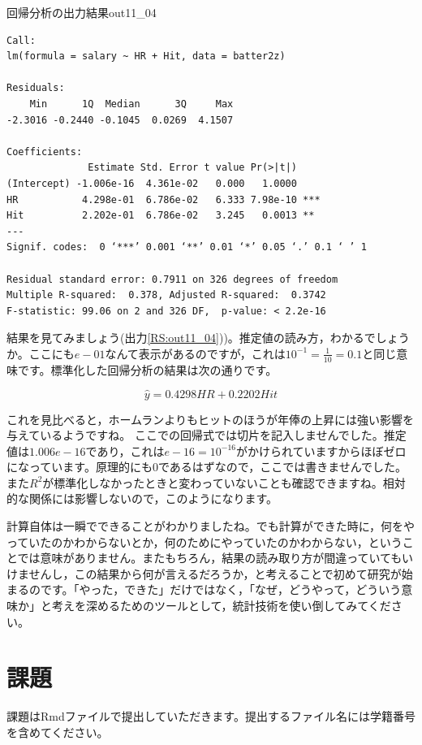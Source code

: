 \documentclass{ltjbook}
\begin{document}
\begin{Rscreen}{回帰分析の出力結果}{out11_04}
\begin{verbatim}
Call:
lm(formula = salary ~ HR + Hit, data = batter2z)

Residuals:
    Min      1Q  Median      3Q     Max 
-2.3016 -0.2440 -0.1045  0.0269  4.1507 

Coefficients:
              Estimate Std. Error t value Pr(>|t|)    
(Intercept) -1.006e-16  4.361e-02   0.000   1.0000    
HR           4.298e-01  6.786e-02   6.333 7.98e-10 ***
Hit          2.202e-01  6.786e-02   3.245   0.0013 ** 
---
Signif. codes:  0 ‘***’ 0.001 ‘**’ 0.01 ‘*’ 0.05 ‘.’ 0.1 ‘ ’ 1

Residual standard error: 0.7911 on 326 degrees of freedom
Multiple R-squared:  0.378,	Adjusted R-squared:  0.3742 
F-statistic: 99.06 on 2 and 326 DF,  p-value: < 2.2e-16
\end{verbatim}
\end{Rscreen}

結果を見てみましょう(出力\ref{RS:out11_04}))。推定値の読み方，わかるでしょうか。ここにも$e-01$なんて表示があるのですが，これは$10^{-1}=\frac{1}{10}=0.1$と同じ意味です。標準化した回帰分析の結果は次の通りです。

\[ \hat{y} = 0.4298 HR + 0.2202 Hit \]

これを見比べると，ホームランよりもヒットのほうが年俸の上昇には強い影響を与えているようですね。
ここでの回帰式では切片を記入しませんでした。推定値は$1.006e-16$であり，これは$e-16=10^{-16}$がかけられていますからほぼゼロになっています。原理的にも$0$であるはずなので，ここでは書きませんでした。
また$R^2$が標準化しなかったときと変わっていないことも確認できますね。相対的な関係には影響しないので，このようになります。

計算自体は一瞬でできることがわかりましたね。でも計算ができた時に，何をやっていたのかわからないとか，何のためにやっていたのかわからない，ということでは意味がありません。またもちろん，結果の読み取り方が間違っていてもいけませんし，この結果から何が言えるだろうか，と考えることで初めて研究が始まるのです。「やった，できた」だけではなく，「なぜ，どうやって，どういう意味か」と考えを深めるためのツールとして，統計技術を使い倒してみてください。

\section{課題}
課題はRmdファイルで提出していただきます。提出するファイル名には学籍番号を含めてください。
\end{document}
